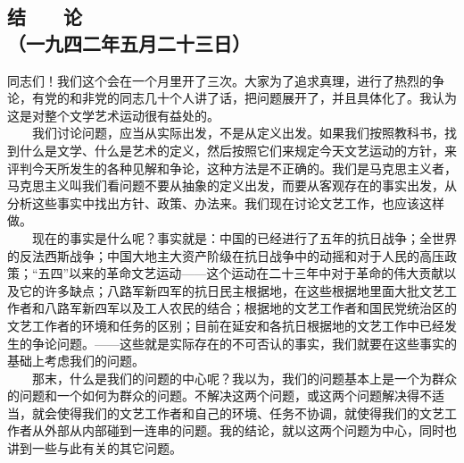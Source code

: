 \documentclass[cn,11pt,chinese]{elegantbook}
\def\myformat#1{\hfil\hfil #1}
\begin{document}
\subsection*{\myformat{结　　论}\\\myformat{（一九四二年五月二十三日）}}
同志们！我们这个会在一个月里开了三次。大家为了追求真理，进行了热烈的争论，有党的和非党的同志几十个人讲了话，把问题展开了，并且具体化了。我认为这是对整个文学艺术运动很有益处的。\\
　　我们讨论问题，应当从实际出发，不是从定义出发。如果我们按照教科书，找到什么是文学、什么是艺术的定义，然后按照它们来规定今天文艺运动的方针，来评判今天所发生的各种见解和争论，这种方法是不正确的。我们是马克思主义者，马克思主义叫我们看问题不要从抽象的定义出发，而要从客观存在的事实出发，从分析这些事实中找出方针、政策、办法来。我们现在讨论文艺工作，也应该这样做。\\
　　现在的事实是什么呢？事实就是：中国的已经进行了五年的抗日战争；全世界的反法西斯战争；中国大地主大资产阶级在抗日战争中的动摇和对于人民的高压政策；“五四”以来的革命文艺运动——这个运动在二十三年中对于革命的伟大贡献以及它的许多缺点；八路军新四军的抗日民主根据地，在这些根据地里面大批文艺工作者和八路军新四军以及工人农民的结合；根据地的文艺工作者和国民党统治区的文艺工作者的环境和任务的区别；目前在延安和各抗日根据地的文艺工作中已经发生的争论问题。——这些就是实际存在的不可否认的事实，我们就要在这些事实的基础上考虑我们的问题。\\
　　那末，什么是我们的问题的中心呢？我以为，我们的问题基本上是一个为群众的问题和一个如何为群众的问题。不解决这两个问题，或这两个问题解决得不适当，就会使得我们的文艺工作者和自己的环境、任务不协调，就使得我们的文艺工作者从外部从内部碰到一连串的问题。我的结论，就以这两个问题为中心，同时也讲到一些与此有关的其它问题。\\
\end{document}
